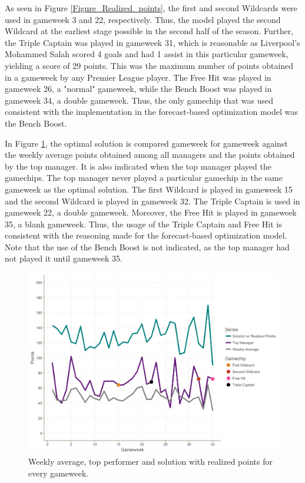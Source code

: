 \FloatBarrier

As seen in Figure \ref{Figure_Realized_points}, the first and second Wildcards were used in gameweek 3 and 22, respectively. Thus, the model played the second Wildcard at the earliest stage possible in the second half of the season. Further, the Triple Captain was played in gameweek 31, which is reasonable as Liverpool's Mohammed Salah scored 4 goals and had 1 assist in this particular gameweek, yielding a score of 29 points. This was the maximum number of points obtained in a gameweek by any Premier League player. The Free Hit was played in gameweek 26, a "normal" gameweek, while the Bench Boost was played in gameweek 34, a double gameweek. Thus, the only gamechip that was used consistent with the implementation in the forecast-based optimization model was the Bench Boost.

\newpar

In Figure \ref{Figure_Comparison}, the optimal solution is compared gameweek for gameweek against the weekly average points obtained among all managers and the points obtained by the top manager. It is also indicated when the top manager played the gamechips. The top manager never played a particular gamechip in the same gameweek as the optimal solution. The first Wildcard is played in gameweek 15 and the second Wildcard is played in gameweek 32. The Triple Captain is used in gameweek 22, a double gameweek. Moreover, the Free Hit is played in gameweek 35, a blank gameweek. Thus, the usage of the Triple Captain and Free Hit is consistent with the reasoning made for the forecast-based optimization model. Note that the use of the Bench Boost is not indicated, as the top manager had not played it until gameweek 35.

\newpar

\begin{figure}[H]
\label{fig:Comparison}
    \centering
    \includegraphics[scale=0.45]{fig/chapter_7/perf_top_avg.png}
    \caption{Weekly average, top performer and solution with realized points for every gameweek.}
\label{Figure_Comparison}    
\end{figure}

